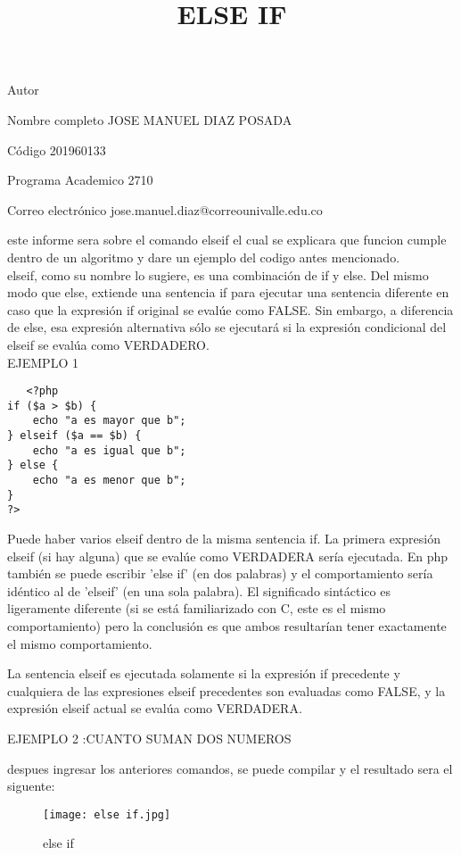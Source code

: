 \documentclass[letterpaper,12pt]{article}
\title{ELSE IF}
\begin{document}
\maketitle

 \begin{cvlist}{Autor}
	\item[Nombre completo]  JOSE MANUEL DIAZ POSADA 
	\item[Código] 201960133
	\item[Programa Academico]2710 
	\item[Correo electrónico]jose.manuel.diaz@correounivalle.edu.co
\end{cvlist}

este informe sera sobre el comando elseif el cual se explicara que funcion cumple dentro de un algoritmo y dare un ejemplo del codigo antes mencionado.\\elseif, como su nombre lo sugiere, es una combinación de if y else. Del mismo modo que else, extiende una sentencia if para ejecutar una sentencia diferente en caso que la expresión if original se evalúe como FALSE. Sin embargo, a diferencia de else, esa expresión alternativa sólo se ejecutará si la expresión condicional del elseif se evalúa como VERDADERO.\\[0.5pt]


EJEMPLO 1
\begin{verbatim}
   <?php
if ($a > $b) {
    echo "a es mayor que b";
} elseif ($a == $b) {
    echo "a es igual que b";
} else {
    echo "a es menor que b";
}
?>
\end{verbatim}

Puede haber varios elseif dentro de la misma sentencia if. La primera expresión elseif (si hay alguna) que se evalúe como VERDADERA sería ejecutada. En php también se puede escribir 'else if' (en dos palabras) y el comportamiento sería idéntico al de 'elseif' (en una sola palabra). El significado sintáctico es ligeramente diferente (si se está familiarizado con C, este es el mismo comportamiento) pero la conclusión es que ambos resultarían tener exactamente el mismo comportamiento.

La sentencia elseif es ejecutada solamente si la expresión if precedente y cualquiera de las expresiones elseif precedentes son evaluadas como FALSE, y la expresión elseif actual se evalúa como VERDADERA.




EJEMPLO 2 :CUANTO SUMAN DOS NUMEROS

despues ingresar los anteriores comandos, se puede compilar y el resultado sera el siguente:
\begin{figure}[h!]
\centering
\texttt{[image: else if.jpg]}
\caption{else if}
\label{Figura: 1}
\end{figure}
\end{document}
